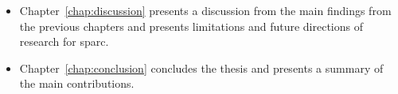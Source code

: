 \begin{itemize}
	\item Chapter~\ref{chap:discussion} presents a discussion from the main findings from the previous chapters and presents limitations and future directions of research for \gls{sparc}.
	
	\item Chapter~\ref{chap:conclusion} concludes the thesis and presents a summary of the main contributions.
	
\end{itemize}
